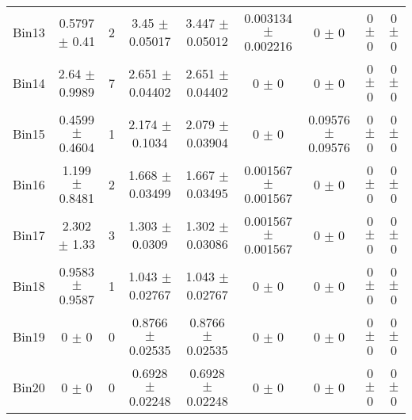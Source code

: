 \begin{tabular}{@{\extracolsep{4pt}}lcccccccc@{}}
     Bin13 & 0.5797 $\pm$ 0.41 & 2 & 3.45 $\pm$ 0.05017 & 3.447 $\pm$ 0.05012 & 0.003134 $\pm$ 0.002216 & 0 $\pm$ 0 & 0 $\pm$ 0 & 0 $\pm$ 0 \\ 
     Bin14 & 2.64 $\pm$ 0.9989 & 7 & 2.651 $\pm$ 0.04402 & 2.651 $\pm$ 0.04402 & 0 $\pm$ 0 & 0 $\pm$ 0 & 0 $\pm$ 0 & 0 $\pm$ 0 \\ 
     Bin15 & 0.4599 $\pm$ 0.4604 & 1 & 2.174 $\pm$ 0.1034 & 2.079 $\pm$ 0.03904 & 0 $\pm$ 0 & 0.09576 $\pm$ 0.09576 & 0 $\pm$ 0 & 0 $\pm$ 0 \\ 
     Bin16 & 1.199 $\pm$ 0.8481 & 2 & 1.668 $\pm$ 0.03499 & 1.667 $\pm$ 0.03495 & 0.001567 $\pm$ 0.001567 & 0 $\pm$ 0 & 0 $\pm$ 0 & 0 $\pm$ 0 \\ 
     Bin17 & 2.302 $\pm$ 1.33 & 3 & 1.303 $\pm$ 0.0309 & 1.302 $\pm$ 0.03086 & 0.001567 $\pm$ 0.001567 & 0 $\pm$ 0 & 0 $\pm$ 0 & 0 $\pm$ 0 \\ 
     Bin18 & 0.9583 $\pm$ 0.9587 & 1 & 1.043 $\pm$ 0.02767 & 1.043 $\pm$ 0.02767 & 0 $\pm$ 0 & 0 $\pm$ 0 & 0 $\pm$ 0 & 0 $\pm$ 0 \\ 
     Bin19 & 0 $\pm$ 0 & 0 & 0.8766 $\pm$ 0.02535 & 0.8766 $\pm$ 0.02535 & 0 $\pm$ 0 & 0 $\pm$ 0 & 0 $\pm$ 0 & 0 $\pm$ 0 \\ 
     Bin20 & 0 $\pm$ 0 & 0 & 0.6928 $\pm$ 0.02248 & 0.6928 $\pm$ 0.02248 & 0 $\pm$ 0 & 0 $\pm$ 0 & 0 $\pm$ 0 & 0 $\pm$ 0 \\ 
\hline\hline
  \end{tabular}
